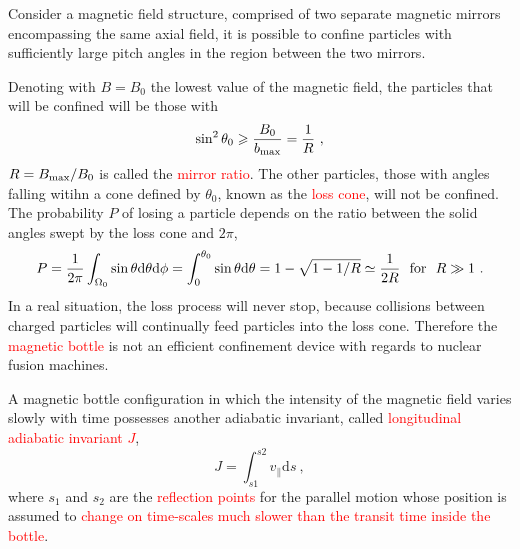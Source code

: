 \documentclass[12pt,a4paper]{article}
\newcommand{\dif}{\mathrm{d}}
\begin{document}
Consider a magnetic field structure, comprised of two separate magnetic mirrors encompassing the same axial field, it is possible to confine particles with sufficiently large pitch angles in the region between the two mirrors.

Denoting with $B = B_0$ the lowest value of the magnetic field, the particles that will be confined will be those with
\begin{equation}
\sin^2 \theta_0 \geqslant \frac{B_0}{b_{\rm max}} = \frac{1}{R} ~,
\end{equation}
$R = B_{\rm max}/B_0$ is called the \textcolor{red}{mirror ratio}. The other particles, those with angles falling witihn a cone defined by $\theta_0$, known as the \textcolor{red}{loss cone}, will not be confined. The probability $P$ of losing a particle depends on the ratio between the solid angles swept by the loss cone and $2\pi$,
\begin{equation*}
P = \frac{1}{2\pi} \int_{\Omega_0} \sin \theta \dif \theta \dif \phi = \int_0^{\theta_0} \sin \theta \dif \theta = 1-\sqrt{1-1/R} \simeq \frac{1}{2R} ~~{\rm for} ~~ R \gg 1 ~.
\end{equation*}
In a real situation, the loss process will never stop, because collisions between charged particles will continually feed particles into the loss cone. Therefore the \textcolor{red}{magnetic bottle} is not an efficient confinement device with regards to nuclear fusion machines.

A magnetic bottle configuration in which the intensity of the magnetic field varies slowly with time possesses another adiabatic invariant, called \textcolor{red}{longitudinal adiabatic invariant $J$}, 
\begin{equation*}
J = \int_{s1}^{s2} v_\parallel \dif s ~,
\end{equation*}
where $s_1$ and $s_2$ are the \textcolor{red}{reflection points} for the parallel motion whose position is assumed to \textcolor{red}{change on time-scales much slower than the transit time inside the bottle}.
\end{document}
